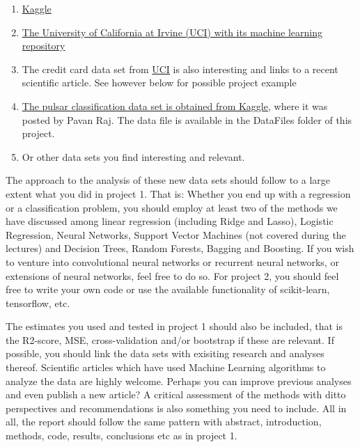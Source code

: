 \documentclass[%
oneside,                 %
final,                   %
10pt]{article}
\begin{document}
\begin{enumerate}
\item \href{{https://www.kaggle.com/datasets}}{Kaggle}

\item \href{{https://archive.ics.uci.edu/ml/index.php}}{The University of California at Irvine (UCI) with its machine learning repository}

\item The credit card data set from \href{{https://archive.ics.uci.edu/ml/index.php}}{UCI} is also interesting and links to a recent scientific article. See however below for possible project example

\item \href{{https://www.kaggle.com/pavanraj159/predicting-pulsar-star-in-the-universe/notebook?scriptVersionId=4487650}}{The pulsar classification data set is obtained from Kaggle}, where it was posted by Pavan Raj. The data file is available in the DataFiles folder of this project.

\item Or other data sets you find interesting and relevant.
\end{enumerate}

\noindent
The approach to the analysis of these new data sets should follow to a
large extent what you did in project 1. That is: Whether you end up
with a regression or a classification problem, you should employ at
least two of the methods we have discussed among linear regression
(including Ridge and Lasso), Logistic Regression, Neural Networks,
Support Vector Machines (not covered during the lectures) and Decision Trees, Random Forests, Bagging and Boosting. If you
wish to venture into convolutional neural networks or recurrent neural
networks, or extensions of neural networks, feel free to do so.  For
project 2, you should feel free to write your own code or use the
available functionality of scikit-learn, tensorflow, etc.

The estimates you used and tested in project 1 should also be
included, that is the R2-score, MSE, cross-validation and/or bootstrap
if these are relevant.  If possible, you should link the data sets
with exisiting research and analyses thereof. Scientific articles
which have used Machine Learning algorithms to analyze the data are
highly welcome. Perhaps you can improve previous analyses and even
publish a new article?  A critical assessment of the methods with
ditto perspectives and recommendations is also something you need to
include.  All in all, the report should follow the same pattern with
abstract, introduction, methods, code, results, conclusions etc as in project 1.
\end{document}
